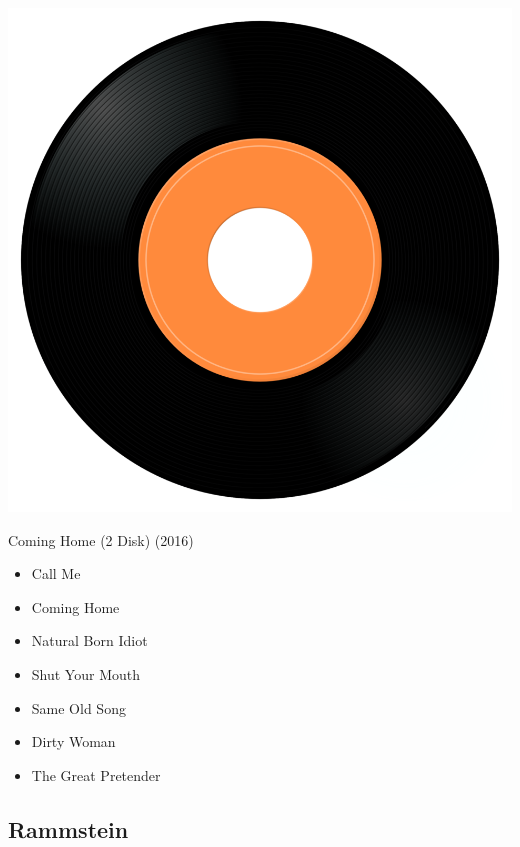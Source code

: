 \begin{minipage}[t]{0.25\textwidth}
\captionsetup{type=figure}
\includegraphics[width=\textwidth]{Images/cover.png}
\caption*{Coming Home (2 Disk) (2016)}
\end{minipage}
\begin{minipage}[t]{0.25\textwidth}\vspace{0pt}
\begin{itemize}[nosep,leftmargin=1em,labelwidth=*,align=left]
	\setlength{\itemsep}{0pt}
	\item Call Me
	\item Coming Home
	\item Natural Born Idiot
	\item Shut Your Mouth 
	\item Same Old Song
	\item Dirty Woman
	\item The Great Pretender
\end{itemize}
\end{minipage}

\subsection{Rammstein}


